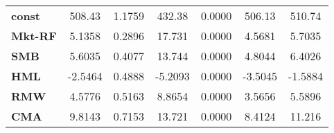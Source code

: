 \begin{center}
\begin{tabular}{lcccccc}
\midrule
\textbf{const}  &       508.43       &       1.1759       &      432.38     &      0.0000      &       506.13      &       510.74       \\
\textbf{Mkt-RF} &       5.1358       &       0.2896       &      17.731     &      0.0000      &       4.5681      &       5.7035       \\
\textbf{SMB}    &       5.6035       &       0.4077       &      13.744     &      0.0000      &       4.8044      &       6.4026       \\
\textbf{HML}    &      -2.5464       &       0.4888       &     -5.2093     &      0.0000      &      -3.5045      &      -1.5884       \\
\textbf{RMW}    &       4.5776       &       0.5163       &      8.8654     &      0.0000      &       3.5656      &       5.5896       \\
\textbf{CMA}    &       9.8143       &       0.7153       &      13.721     &      0.0000      &       8.4124      &       11.216       \\
\bottomrule
\end{tabular}
\end{center}
